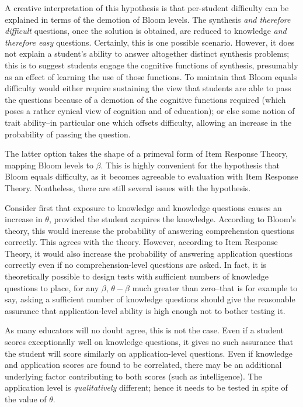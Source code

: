 A creative interpretation of this hypothesis is that per-student difficulty can
be explained in terms of the demotion of Bloom levels.  The synthesis \emph{and
therefore difficult} questions, once the solution is obtained, are reduced to
knowledge \emph{and therefore easy} questions.  Certainly, this is one possible
scenario.  However, it does not explain a student's ability to answer
altogether distinct synthesis problems; this is to suggest students engage the
cognitive functions of synthesis, presumably as an effect of learning the use
of those functions.  To maintain that Bloom equals difficulty would either
require sustaining the view that students are able to pass the questions
because of a demotion of the cognitive functions required (which poses a rather
cynical view of cognition and of education); or else some notion of trait
ability--in particular one which offsets difficulty, allowing an increase in
the probability of passing the question.

The latter option takes the shape of a primeval form of Item Response Theory,
mapping Bloom levels to $\beta$.  This is highly convenient for the hypothesis
that Bloom equals difficulty, as it becomes agreeable to evaluation with Item
Response Theory.  Nontheless, there are still several issues with the
hypothesis.

Consider first that exposure to knowledge and knowledge questions causes an
increase in $\theta$, provided the student acquires the knowledge.  According
to Bloom's theory, this would increase the probability of answering
comprehension questions correctly.  This agrees with the theory.  However,
according to Item Response Theory, it would also increase the probability of
answering application questions correctly even if no comprehension-level
questions are asked.  In fact, it is theoretically possible to design tests
with sufficient numbers of knowledge questions to place, for any $\beta$,
$\theta-\beta$ much greater than zero--that is for example to say, asking a
sufficient number of knowledge questions should give the reasonable assurance
that application-level ability is high enough not to bother testing it.

As many educators will no doubt agree, this is not the case. Even if a student
scores exceptionally well on knowledge questions, it gives no such assurance
that the student will score similarly on application-level questions.  Even if
knowledge and application scores are found to be correlated, there may be an
additional underlying factor contributing to both scores (such as
intelligence).  The application level is \emph{qualitatively} different; hence
it needs to be tested in spite of the value of $\theta$.

